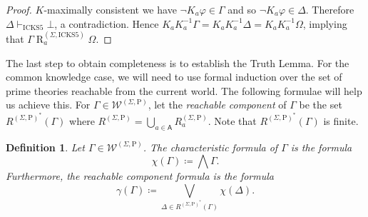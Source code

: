 \documentclass{myifcolog}
\newcommand\C {C}
\newcommand{\K}{K}
\newcommand\A{\mathsf{A}}
\newcommand{\agi}{a}
\newcommand{\Rel}{\mathrel{R}}
\newcommand{\W}{\mathcal{W}}
\newcommand{\hickss}{\mathrm{ICKS5}}
\newcommand{\hickp}{\mathrm{P}}
\newtheorem{definition}[theorem]{Definition}
\newtheorem{lemma}[theorem]{Lemma}
\numberwithin{theorem}{section}
\begin{document}
\begin{proof}
$\K$-maximally consistent we have $\neg \K_\agi \varphi \in \Gamma$ and so $\neg \K_\agi \varphi \in \Delta$. Therefore $\Delta \vdash_\hickss \bot$, a contradiction. Hence $\K_\agi \K_\agi^{-1} \Gamma = \K_\agi \K_\agi^{-1} \Delta = \K_\agi \K_\agi^{-1} \Omega$, implying that $\Gamma \Rel_\agi^{(\Sigma, \hickss)} \Omega$.
\end{proof}

The last step to obtain completeness is to establish the Truth Lemma. For the common knowledge case, we will need to use formal induction over the set of prime theories reachable from the current world. The following formulae will help us achieve this. For $\Gamma \in \W^{(\Sigma, \hickp)}$, let the \emph{reachable component} of $\Gamma$ be the set $R^{(\Sigma, \hickp)^*}(\Gamma)$ where $R^{(\Sigma, \hickp)} = \bigcup_{\agi \in \A} R_\agi^{(\Sigma, \hickp)}$. Note that $R^{(\Sigma, \hickp)^*}(\Gamma)$ is finite.

\begin{definition}\label{d: characteristic formula}
    Let $\Gamma \in \W^{(\Sigma, \hickp)}$. The \emph{characteristic formula} of $\Gamma$ is the formula
    \begin{equation*}
        \chi(\Gamma) \coloneqq \bigwedge \Gamma.
    \end{equation*}
    Furthermore, the \emph{reachable component formula} is the formula
    \begin{equation*}
        \gamma(\Gamma) \coloneqq \bigvee_{\Delta \in R^{(\Sigma, \hickp)^*}(\Gamma)} \chi(\Delta).
    \end{equation*}
\end{definition}



\end{document}
